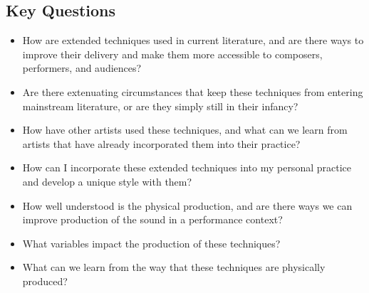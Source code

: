 \subsection{Key Questions}
\begin{itemize}
    \item How are extended techniques used in current literature, and are there ways to improve their delivery and make them more accessible to composers, performers, and audiences?
    \item Are there extenuating circumstances that keep these techniques from entering mainstream literature, or are they simply still in their infancy? 
    \item How have other artists used these techniques, and what can we learn from artists that have already incorporated them into their practice?
    \item How can I incorporate these extended techniques into my personal practice and develop a unique style with them?
    \item How well understood is the physical production, and are there ways we can improve production of the sound in a performance context?
    \item What variables impact the production of these techniques?
    \item What can we learn from the way that these techniques are physically produced? 
\end{itemize}